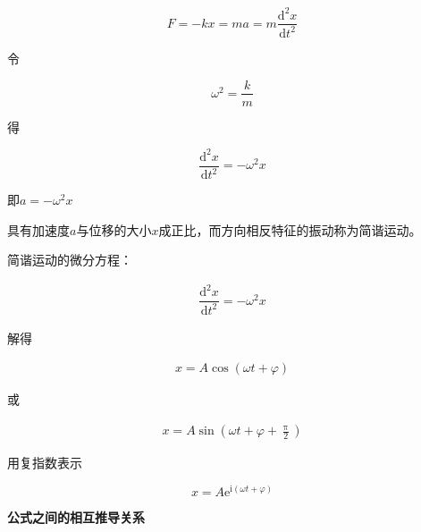 \documentclass[
	12pt, %
	a4paper, %
]{myLegrandOrangeBook}
\newcommand{\rmd}{\mathrm{d}}
\begin{document}
    \begin{equation}
        F=-k x=m a=m \frac{\rmd^2 x}{\rmd t^2}
    \end{equation}

    令
    
    \[
        \omega^2=\frac{k}{m}
    \]
    
    得
    
    \[
        \dfrac{\rmd^2 x}{\rmd t^2} = -\omega^2 x
    \]

    即\(a=-\omega^2 x\)

    具有加速度\(a\)与位移的大小\(x\)成正比，而方向相反特征的振动称为简谐运动。

    简谐运动的微分方程：

    \begin{align}
        \dfrac{\rmd^2 x}{\rmd t^2} = -\omega^2 x
        \label{6-1-2}
    \end{align}

    解得

    \begin{align}
        x = A \cos\left(\omega t + \varphi\right)
    \end{align}

    或

    \begin{align}
        x = A \sin\left(\omega t + \varphi + \frac{\uppi}{2}\right)
    \end{align}

    用复指数表示
    
    \begin{equation}
        x=A \mathrm{e}^{\mathrm{i}(\omega t+\varphi)}
    \end{equation}

    \textbf{公式之间的相互推导关系}
\end{document}
